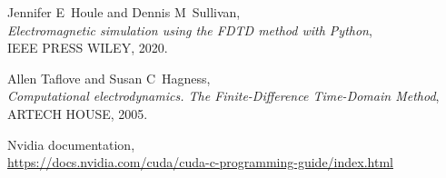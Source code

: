 \documentclass[11pt,a4paper,twoside,pdf]{article}
\numberwithin{equation}{section}
\begin{document}
\begin{thebibliography}{100}

  Jennifer E~Houle and Dennis M~Sullivan, \\
  {\em Electromagnetic simulation using the FDTD method with Python}, \\
  IEEE PRESS WILEY, 2020.
  
Allen Taflove and Susan C~Hagness, \\
{\em Computational electrodynamics. The Finite-Difference Time-Domain Method}, \\
ARTECH HOUSE, 2005.

 Nvidia documentation, \\
 \href{https://docs.nvidia.com/cuda/cuda-c-programming-guide/index.html}{https://docs.nvidia.com/cuda/cuda-c-programming-guide/index.html}






 
\end{thebibliography}
\end{document}
